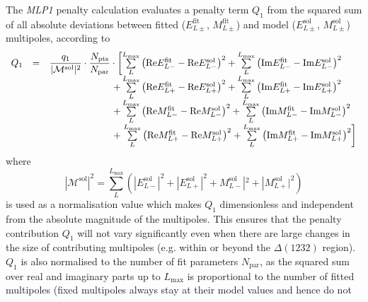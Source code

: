 \documentclass[a4paper,10pt]{article}
\def\Re{\mathrm{Re}}
\def\Im{\mathrm{Im}}
\begin{document}
The \textit{MLP1} penalty calculation evaluates a penalty term $Q_1$ from the squared sum of all absolute deviations
between fitted 
(${E}_{L\pm}^\mathrm{fit}$, ${M}_{L\pm}^\mathrm{fit}$)
and model
(${E}_{L\pm}^\mathrm{sol}$, ${M}_{L\pm}^\mathrm{sol}$)
multipoles, according to
\begin{displaymath}
\begin{array}{lcl}
 Q_1 &=& \dfrac{q_1}{|\mathcal{M}^\mathrm{sol}|^2}\cdot \dfrac{N_\mathrm{pts}}{N_\mathrm{par}} \cdot \left[
\sum\limits_L^{L_\mathrm{max}}\left(\Re E_{L-}^\mathrm{fit} - \Re E_{L-}^\mathrm{sol}\right)^2
+
\sum\limits_L^{L_\mathrm{max}}\left(\Im E_{L-}^\mathrm{fit} - \Im E_{L-}^\mathrm{sol}\right)^2\right.\\
&&\hspace{6.73em}+
\sum\limits_L^{L_\mathrm{max}}\left(\Re E_{L+}^\mathrm{fit} - \Re E_{L+}^\mathrm{sol}\right)^2
+
\sum\limits_L^{L_\mathrm{max}}\left(\Im E_{L+}^\mathrm{fit} - \Im E_{L+}^\mathrm{sol}\right)^2\\
&&\hspace{6.73em}+
\sum\limits_L^{L_\mathrm{max}}\left(\Re M_{L-}^\mathrm{fit} - \Re M_{L-}^\mathrm{sol}\right)^2
+
\sum\limits_L^{L_\mathrm{max}}\left(\Im M_{L-}^\mathrm{fit} - \Im M_{L-}^\mathrm{sol}\right)^2\\
&&\hspace{6.73em}+\left.
\sum\limits_L^{L_\mathrm{max}}\left(\Re M_{L+}^\mathrm{fit} - \Re M_{L+}^\mathrm{sol}\right)^2
+
\sum\limits_L^{L_\mathrm{max}}\left(\Im M_{L+}^\mathrm{fit} - \Im M_{L+}^\mathrm{sol}\right)^2
\right]
\end{array}
\end{displaymath}
where
\begin{displaymath}
 |\mathcal{M}^\mathrm{sol}|^2 = \sum\limits_L^{L_\mathrm{max}}
\left(|E_{L-}^\mathrm{sol}|^2 + |E_{L+}^\mathrm{sol}|^2 + M_{L-}^\mathrm{sol}|^2 + |M_{L+}^\mathrm{sol}|^2\right)
\end{displaymath}
is used as a normalisation value which makes $Q_1$ dimensionless and independent from the absolute magnitude of the multipoles.
This ensures that the penalty contribution $Q_1$ will not vary significantly even when there are large changes in the size of
contributing multipoles (e.g. within or beyond the $\Delta(1232)$ region). $Q_1$ is also normalised
to the number of fit parameters $N_\mathrm{par}$, as the squared sum over real and imaginary parts up to $L_\mathrm{max}$
is proportional to the number of fitted multipoles (fixed multipoles always stay at their model values and hence do not
\end{document}
